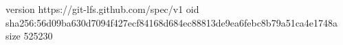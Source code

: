 version https://git-lfs.github.com/spec/v1
oid sha256:56d09ba630d7094f427ecf84168d684ec88813de9ea6febc8b79a51ca4e1748a
size 525230
